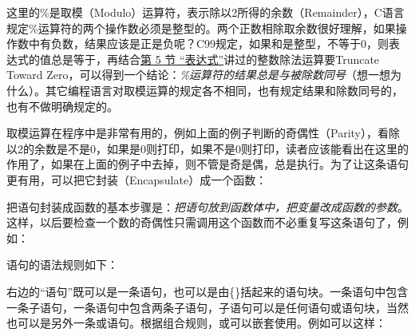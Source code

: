 

这里的\%是取模（Modulo）运算符，表示除以2所得的余数（Remainder），C语言规定\%运算符的两个操作数必须是整型的。两个正数相除取余数很好理解，如果操作数中有负数，结果应该是正是负呢？C99规定，如果和是整型，不等于0，则表达式的值总是等于，再结合\hyperlink{db.expr.expression}{第 5 节 “表达式”}讲过的整数除法运算要Truncate Toward Zero，可以得到一个结论：\emph{\%运算符的结果总是与被除数同号}（想一想为什么）。其它编程语言对取模运算的规定各不相同，也有规定结果和除数同号的，也有不做明确规定的。



取模运算在程序中是非常有用的，例如上面的例子判断的奇偶性（Parity），看除以2的余数是不是0，如果是0则打印，如果不是0则打印，读者应该能看出在这里的作用了，如果在上面的例子中去掉，则不管是奇是偶，总是执行。为了让这条语句更有用，可以把它封装（Encapsulate）成一个函数：




把语句封装成函数的基本步骤是：\emph{把语句放到函数体中，把变量改成函数的参数}。这样，以后要检查一个数的奇偶性只需调用这个函数而不必重复写这条语句了，例如：




语句的语法规则如下：


\begin{BookLiteral}
\end{BookLiteral}


右边的“语句”既可以是一条语句，也可以是由\{\}括起来的语句块。一条语句中包含一条子语句，一条语句中包含两条子语句，子语句可以是任何语句或语句块，当然也可以是另外一条或语句。根据组合规则，或可以嵌套使用。例如可以这样：




